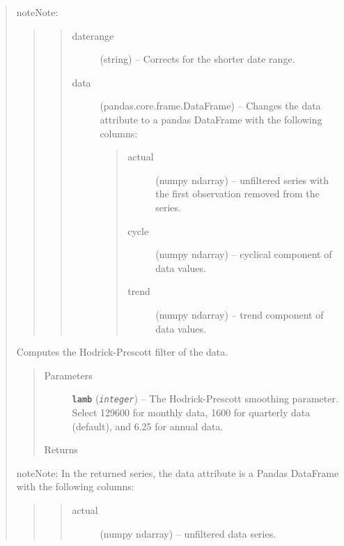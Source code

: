 \documentclass[letterpaper,10pt,english]{sphinxmanual}
\begin{document}
\begin{fulllineitems}
\begin{quote}
\begin{fulllineitems}
\begin{notice}{note}{Note:}
\begin{quote}
\begin{quote}
\begin{description}
\item[{daterange}] \leavevmode
(string) -- Corrects for the shorter date range.

\item[{data}] \leavevmode
(pandas.core.frame.DataFrame) --  Changes the data attribute to a pandas DataFrame with the following columns:
\begin{quote}\begin{description}
\item[{actual}] \leavevmode
(numpy ndarray) -- unfiltered series with the first observation removed from the series.

\item[{cycle}] \leavevmode
(numpy ndarray) --  cyclical component of data values.

\item[{trend}] \leavevmode
(numpy ndarray) --  trend component of data values.

\end{description}\end{quote}

\end{description}\end{quote}
\end{quote}
\end{notice}

\end{fulllineitems}


\begin{fulllineitems}
\label{series_class:fredpy.series.hpfilter}
Computes the Hodrick-Prescott filter of the data.
\begin{quote}\begin{description}
\item[{Parameters}] \leavevmode
\textbf{\texttt{lamb}} (\emph{\texttt{integer}}) -- The Hodrick-Prescott smoothing parameter. Select 129600 for monthly data, 1600 for quarterly data (default), and 6.25 for annual data.

\item[{Returns}] \leavevmode
{\hyperref[series_class:fredpy.series]{}}

\end{description}\end{quote}

\begin{notice}{note}{Note:}
In the returned series, the data attribute is a Pandas DataFrame with the following columns:
\begin{quote}
\begin{quote}\begin{description}
\item[{actual}] \leavevmode
(numpy ndarray) --  unfiltered data series.


\end{description}
\end{quote}
\end{quote}
\end{notice}
\end{fulllineitems}
\end{quote}
\end{fulllineitems}
\end{document}
